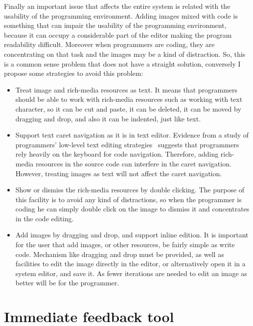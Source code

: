 Finally an important issue that affects the entire system is related with the usability of the programming environment. Adding images mixed with code is something that can impair the usability of the programming environment, because it can occupy a considerable part of the editor making the program readability difficult. Moreover when programmers are coding, they are concentrating on that task and the images may be a kind of distraction. So, this is a common sense problem that does not have a straight solution, conversely I propose some strategies to avoid this problem:

\begin{itemize}
\item Treat image and rich-media resources as text. It means that programmers should be able to work with rich-media resources such as working with text character, so it can be cut and paste, it can be deleted, it can be moved by dragging and drop, and also it can be indented, just like text.

\item Support text caret navigation as it is in text editor. Evidence from a study of programmers' low-level text editing strategies~\citep{ko2005design} suggests that programmers rely heavily on the keyboard for code navigation. Therefore, adding rich-media resources in the source code can interfere in the caret navigation. However, treating images as text will not affect the caret navigation.

\item Show or dismiss the rich-media resources by double clicking. The purpose of this facility is to avoid any kind of distractions, so when the programmer is coding he can simply double click on the image to dismiss it and concentrates in the code editing.

\item Add images by dragging and drop, and support inline edition. It is important for the user that add images, or other resources, be fairly simple as write code. Mechanism like dragging and drop must be provided, as well as facilities to edit the image directly in the editor, or alternatively open it in a system editor, and save it. As 
fewer iterations are needed to edit an image as better will be for the programmer.
\end{itemize}


\section{Immediate feedback tool}

